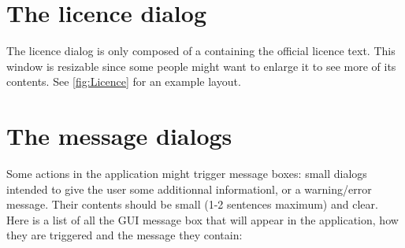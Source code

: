 \section{The licence dialog} \label{dlg:Licence}
The licence dialog is only composed of a  containing the official
licence text. This window is resizable since some people might want to enlarge it
to see more of its contents. See \cref{fig:Licence} for an example layout.


\section{The message dialogs} \label{dlg::message}
Some actions in the  application might trigger message boxes:
small dialogs intended to give the user some additionnal informationl, or a
warning/error message. Their contents should be small (1-2 sentences maximum)
and clear. Here is a list of all the GUI message box that will appear in the
 application, how they are triggered and the message they
contain:

